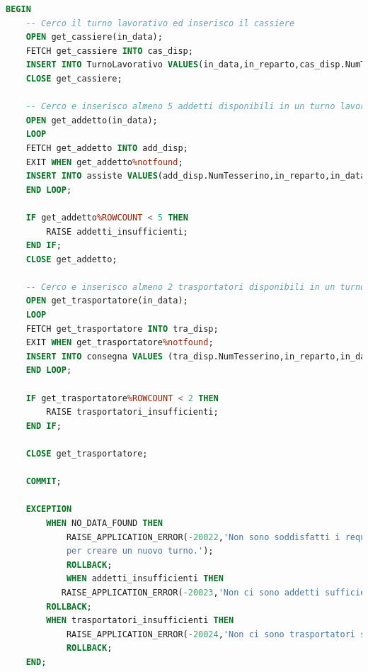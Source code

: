 \documentclass[12pt]{report}
\begin{document}
\begin{lstlisting}[language=SQL,caption={GENERA\_TURNO\_LAVORATIVO}]
    BEGIN
    -- Cerco il turno lavorativo ed inserisco il cassiere
    OPEN get_cassiere(in_data);
    FETCH get_cassiere INTO cas_disp;
    INSERT INTO TurnoLavorativo VALUES(in_data,in_reparto,cas_disp.NumTesserino,in_casaro);
    CLOSE get_cassiere;
    
    -- Cerco e inserisco almeno 5 addetti disponibili in un turno lavorativo
    OPEN get_addetto(in_data);
    LOOP
    FETCH get_addetto INTO add_disp; 
    EXIT WHEN get_addetto%notfound;
    INSERT INTO assiste VALUES(add_disp.NumTesserino,in_reparto,in_data);
    END LOOP;
    
    IF get_addetto%ROWCOUNT < 5 THEN
        RAISE addetti_insufficienti;
    END IF;
  	CLOSE get_addetto;

    -- Cerco e inserisco almeno 2 trasportatori disponibili in un turno lavorativo
    OPEN get_trasportatore(in_data);
    LOOP
    FETCH get_trasportatore INTO tra_disp; 
    EXIT WHEN get_trasportatore%notfound;
    INSERT INTO consegna VALUES (tra_disp.NumTesserino,in_reparto,in_data);
    END LOOP;
    
    IF get_trasportatore%ROWCOUNT < 2 THEN
        RAISE trasportatori_insufficienti;
    END IF;

    CLOSE get_trasportatore;
	
	COMMIT;
	
	EXCEPTION
	    WHEN NO_DATA_FOUND THEN
	        RAISE_APPLICATION_ERROR(-20022,'Non sono soddisfatti i requisiti 
	        per creare un nuovo turno.');
	        ROLLBACK;
            WHEN addetti_insufficienti THEN
		   RAISE_APPLICATION_ERROR(-20023,'Non ci sono addetti sufficienti.');
		ROLLBACK;
	    WHEN trasportatori_insufficienti THEN
		    RAISE_APPLICATION_ERROR(-20024,'Non ci sono trasportatori sufficienti.');
	        ROLLBACK;
    END;
\end{lstlisting}

\newpage
\end{document}
